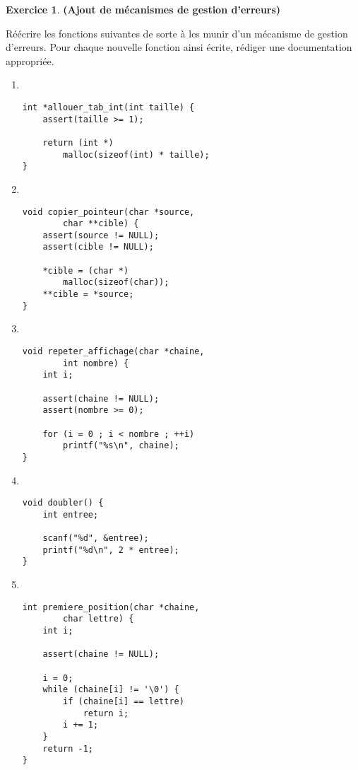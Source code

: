 \documentclass[12pt]{article}
\theoremstyle{definition}
\newtheorem{Exercice}{Exercice}
\begin{document}
\begin{Exercice} {\bf (Ajout de mécanismes de gestion d'erreurs)}\smallskip
    
Réécrire les fonctions suivantes de sorte à les munir d'un mécanisme 
de gestion d'erreurs. Pour chaque nouvelle fonction ainsi écrite, 
rédiger une documentation appropriée.
\begin{multicols}{2}
\begin{enumerate}
\item~
\begin{lstlisting}
int *allouer_tab_int(int taille) {
    assert(taille >= 1);

    return (int *) 
        malloc(sizeof(int) * taille);
}
\end{lstlisting}

\item~
\begin{lstlisting}
void copier_pointeur(char *source, 
        char **cible) {
    assert(source != NULL);
    assert(cible != NULL);
    
    *cible = (char *) 
        malloc(sizeof(char));
    **cible = *source;
} 
\end{lstlisting}


\item~
\begin{lstlisting}
void repeter_affichage(char *chaine, 
        int nombre) {
    int i;
    
    assert(chaine != NULL);
    assert(nombre >= 0);
    
    for (i = 0 ; i < nombre ; ++i) 
        printf("%s\n", chaine);
}
\end{lstlisting}

\item~
\begin{lstlisting}
void doubler() {
    int entree;
    
    scanf("%d", &entree);
    printf("%d\n", 2 * entree);
}
\end{lstlisting}
\bigskip
\bigskip
\bigskip
\bigskip

\item~
\begin{lstlisting}
int premiere_position(char *chaine, 
        char lettre) {
    int i;

    assert(chaine != NULL);
    
    i = 0;
    while (chaine[i] != '\0') {
        if (chaine[i] == lettre)
            return i;
        i += 1;
    }
    return -1;
}
\end{lstlisting}
\end{enumerate}
\end{multicols}
\end{Exercice}
\bigskip
\end{document}
